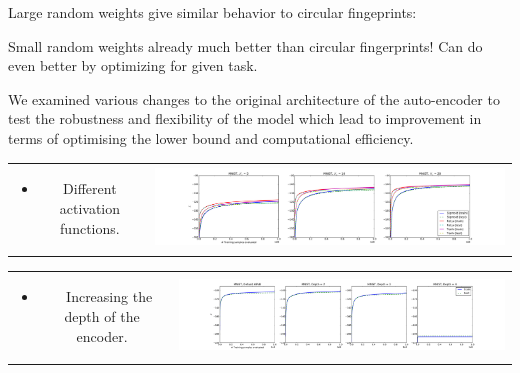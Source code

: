 \documentclass[landscape,a0b,final,a4resizeable]{include/a0poster}
\begin{document}
\begin{poster}
\begin{multicols}{3}

Large random weights give similar behavior to circular fingeprints:

\vspace{0.5em}

Small random weights already much better than circular fingerprints!
Can do even better by optimizing for given task.

\vspace{1in}


We examined various changes to the original architecture of the auto-encoder to test the robustness and flexibility of the model which lead to improvement in terms of optimising the lower bound and computational efficiency.

\begin{tabular}{cc}
\begin{minipage}[c]{0.25\columnwidth}
\begin{itemize}
\item Different activation functions.
\end{itemize}
\end{minipage} & 
\begin{minipage}[c]{0.75\columnwidth}
\includegraphics[width=1.0\columnwidth, clip, trim=4mm 0mm 4mm 4mm]{../res/mnist_activations}
\end{minipage}
\end{tabular}

\vspace{0.5em}

\begin{tabular}{cc}
\begin{minipage}[c]{0.25\columnwidth}
\begin{itemize}
\item ~~Increasing the depth of the encoder.
\end{itemize}
\end{minipage} & 
\begin{minipage}[c]{0.75\columnwidth}
\includegraphics[width=1.0\columnwidth, clip, trim=4mm 0mm 4mm 4mm]{../res/mnist_depth}
\end{minipage}
\end{tabular}


\end{multicols}
\end{poster}
\end{document}
